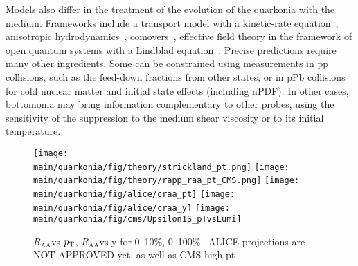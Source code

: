 \documentclass[../report.tex]{subfiles}
\providecommand{\main}{..}
\providecommand{\pt}{\ensuremath{p_\text{T}}\Xspace}
\providecommand{\raa}{\ensuremath{R_\text{AA}}\Xspace}
\begin{document}
Models also differ in the treatment of the evolution of the quarkonia with the medium. Frameworks include a transport model with a kinetic-rate equation~\cite{Du:2017qkv},
anisotropic hydrodynamics~\cite{Krouppa:2017jlg}, comovers~\cite{Ferreiro:2018wbd}, effective field theory in the framework of open quantum systems with 
a Lindblad equation~\cite{Brambilla:2017zei}. Precise predictions require many other ingredients. Some can be constrained using measurements in pp collisions, such as
the feed-down fractions from other states, or in pPb collisions for cold nuclear matter and initial state effects (including nPDF). In other cases, bottomonia may bring information
complementary to other probes, using the sensitivity of the suppression to the medium shear viscosity or to its initial temperature.

\begin{figure}
\begin{center}
 \texttt{[image: \\main/quarkonia/fig/theory/strickland\_pt.png]}
 \texttt{[image: \\main/quarkonia/fig/theory/rapp\_raa\_pt\_CMS.png]}
 \texttt{[image: \\main/quarkonia/fig/alice/craa\_pt]}
 \texttt{[image: \\main/quarkonia/fig/alice/craa\_y]}
 \texttt{[image: \\main/quarkonia/fig/cms/Upsilon1S\_pTvsLumi]}
\end{center}

 \caption{\raa vs $\pt$, \raa vs y for 0--10\%, 0--100\%~\cite{Krouppa:2017jlg,Du:2017qkv} ALICE projections are NOT APPROVED yet, as well as CMS high pt
 }
 \label{fig:upsi_raa_pt_y}
\end{figure}
\end{document}
